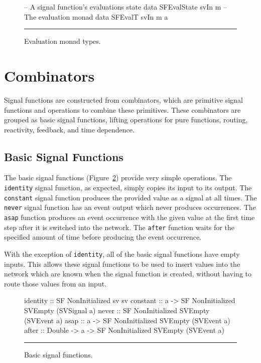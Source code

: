 \begin{figure}
\begin{code}
-- A signal function's evaluations state
data SFEvalState svIn m
-- The evaluation monad
data SFEvalT svIn m a
\end{code}
\hrule
\caption{Evaluation monad types.}
\label{figure:evaluation_monad_types}
\end{figure}

\section{Combinators}
\label{section:System_Design_and_Interface-Combinators}

Signal functions are constructed from combinators, which are primitive signal
functions and operations to combine these primitives. These combinators are
grouped as basic signal functions, lifting operations for pure functions,
routing, reactivity, feedback, and time dependence.

\subsection{Basic Signal Functions}
\label{subsection:System_Design_and_Interface-Combinators-Basic_Signal_Functions}

The basic signal functions (Figure~\ref{figure:basic_signal_functions})
provide very simple operations. The {\tt identity} signal function, as expected,
simply copies its input to its output. The {\tt constant} signal function
produces the provided value as a signal at all times. The {\tt never} signal
function has an event output which never produces occurrences. The {\tt asap}
function produces an event occurrence with the given value at the first time
step after it is switched into the network. The {\tt after} function waits for
the specified amount of time before producing the event occurrence.

With the exception of {\tt identity}, all of the basic signal functions have
empty inputs. This allows these signal functions to be used to insert values
into the network which are known when the signal function is created, without
having to route those values from an input.

\begin{figure}
\begin{code}
identity :: SF NonInitialized sv sv
constant :: a -> SF NonInitialized SVEmpty (SVSignal a)
never    :: SF NonInitialized SVEmpty (SVEvent a)
asap     :: a -> SF NonInitialized SVEmpty (SVEvent a)
after    :: Double -> a -> SF NonInitialized SVEmpty (SVEvent a)
\end{code}
\hrule
\caption{Basic signal functions.}
\label{figure:basic_signal_functions}
\end{figure}

